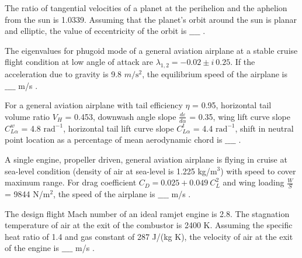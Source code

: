 \iffalse
\chapter{2020}
\author{AI24BTECH11009}
\section{ae}
\fi

\item The ratio of tangential velocities of a planet at the perihelion and the aphelion from the sun is 1.0339. Assuming that the planet's orbit around the sun is planar and elliptic, the value of eccentricity of the orbit is $\_\_\_\_$ . \\
\item The eigenvalues for phugoid mode of a general aviation airplane at a stable cruise flight condition at low angle of attack are $\lambda_{1,2} = -0.02 \pm i\ 0.25$. If the acceleration due to gravity is 9.8 $m/\text{s}^2$, the equilibrium speed of the airplane is $\_\_\_\_$ m/s . \\
\item For a general aviation airplane with tail efficiency $\eta$ = 0.95, horizontal tail volume ratio $V_H$ = 0.453, downwash angle slope $\frac{d\varepsilon}{d\alpha}$ = 0.35, wing lift curve slope $C_{L\alpha}^{w}$ = 4.8 $\text{rad}^{-1}$, horizontal tail lift curve slope $C_{L\alpha}^{t}$ = 4.4 $\text{rad}^{-1}$, shift in neutral point location as a percentage of mean aerodynamic chord is $\_\_\_\_$ . \\
\item A single engine, propeller driven, general aviation airplane is flying in cruise at sea-level condition (density of air at sea-level is 1.225 kg/$\text{m}^3$) with speed to cover maximum range. For drag coefficient $C_D = 0.025 + 0.049\ C_L^2$ and wing loading $\frac{W}{S}$ = 9844 N/$\text{m}^2$, the speed of the airplane is $\_\_\_\_$ m/s . \\
\item The design flight Mach number of an ideal ramjet engine is 2.8. The stagnation temperature of air at the exit of the combustor is 2400 K. Assuming the specific heat ratio of 1.4 and gas constant of 287 J/(kg K), the velocity of air at the exit of the engine is $\_\_\_\_$ m/s . \\
